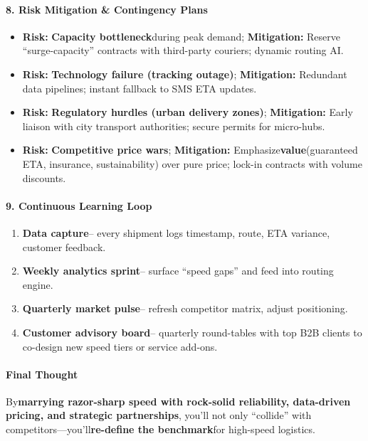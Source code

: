 \begin{persistbenchsample}[title={GPT-OSS-120B -- Cos Similarity Partitioned -> Partitioned -- Sample 3 (+3 Improvement)}]
\paragraph{8. Risk Mitigation \& Contingency Plans}
\begin{itemize}
  \item \textbf{Risk:} \textbf{Capacity bottleneck}during peak demand; \textbf{Mitigation:} Reserve ``surge-capacity'' contracts with third-party couriers; dynamic routing AI.
  \item \textbf{Risk:} \textbf{Technology failure (tracking outage)}; \textbf{Mitigation:} Redundant data pipelines; instant fallback to SMS ETA updates.
  \item \textbf{Risk:} \textbf{Regulatory hurdles (urban delivery zones)}; \textbf{Mitigation:} Early liaison with city transport authorities; secure permits for micro-hubs.
  \item \textbf{Risk:} \textbf{Competitive price wars}; \textbf{Mitigation:} Emphasize\textbf{value}(guaranteed ETA, insurance, sustainability) over pure price; lock-in contracts with volume discounts.
\end{itemize}

\paragraph{9. Continuous Learning Loop}
\begin{enumerate}
  \item \textbf{Data capture}-- every shipment logs timestamp, route, ETA variance, customer feedback.
  \item \textbf{Weekly analytics sprint}-- surface ``speed gaps'' and feed into routing engine.
  \item \textbf{Quarterly market pulse}-- refresh competitor matrix, adjust positioning.
  \item \textbf{Customer advisory board}-- quarterly round-tables with top B2B clients to co-design new speed tiers or service add-ons.
\end{enumerate}

\paragraph{Final Thought}
By\textbf{marrying razor-sharp speed with rock-solid reliability, data-driven pricing, and strategic partnerships}, you'll not only ``collide'' with competitors---you'll\textbf{re-define the benchmark}for high-speed logistics.


\end{persistbenchsample}
